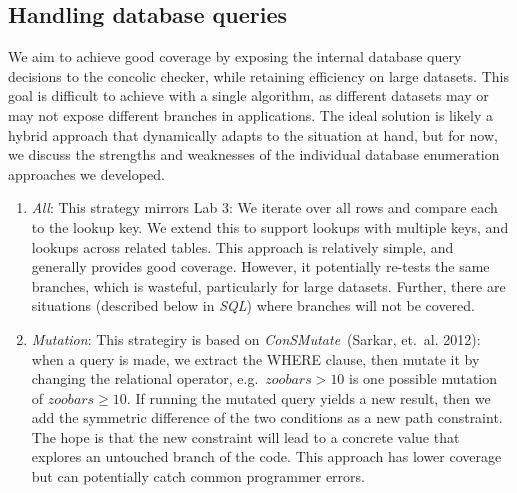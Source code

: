 \documentclass{article}
\begin{document}
\subsection{Handling database queries}

We aim to achieve good coverage
by exposing the internal database query decisions to the concolic checker, while retaining
efficiency on large datasets. This goal is difficult to achieve with a single
algorithm, as different datasets may or may not expose different branches in
applications. The ideal solution is likely a hybrid approach that dynamically adapts to
the situation at hand, but for now, we discuss the strengths and weaknesses of
the individual database enumeration approaches we developed.

\begin{enumerate}
\item \textit{All}:
  This strategy mirrors Lab 3: We iterate over all rows and compare each to the lookup
  key.
  We extend this 
  to support lookups with multiple keys, and lookups across
  related tables.
  This approach is relatively simple, and generally provides good
  coverage. However, it potentially re-tests the same branches,
  which is wasteful, particularly for large datasets. Further, there are situations (described
  below in \textit{SQL}) where branches will not be covered.

\item \textit{Mutation}:
  This strategiry is based on \textit{ConSMutate}~(Sarkar,
  et.\ al. 2012): when a query is made, we extract the WHERE clause,
  then mutate it by changing the relational operator, e.g.\, 
  $zoobars > 10$ is one possible mutation of $zoobars \geq 10$.
  If running the mutated query yields a new result, then we
  add the symmetric difference of the two conditions as a new path
  constraint. The hope is that the new constraint will lead to a
  concrete value that explores an untouched branch of the code. This
  approach has lower coverage but can potentially catch common
  programmer errors.


\end{enumerate}
\end{document}
